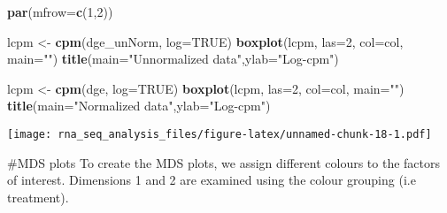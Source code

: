 \documentclass[
]{article}
\newenvironment{Shaded}{\begin{snugshade}}{\end{snugshade}}
\newcommand{\CommentTok}[1]{\textcolor[rgb]{0.56,0.35,0.01}{\textit{#1}}}
\newcommand{\DataTypeTok}[1]{\textcolor[rgb]{0.13,0.29,0.53}{#1}}
\newcommand{\DecValTok}[1]{\textcolor[rgb]{0.00,0.00,0.81}{#1}}
\newcommand{\KeywordTok}[1]{\textcolor[rgb]{0.13,0.29,0.53}{\textbf{#1}}}
\newcommand{\NormalTok}[1]{#1}
\newcommand{\OperatorTok}[1]{\textcolor[rgb]{0.81,0.36,0.00}{\textbf{#1}}}
\newcommand{\OtherTok}[1]{\textcolor[rgb]{0.56,0.35,0.01}{#1}}
\newcommand{\StringTok}[1]{\textcolor[rgb]{0.31,0.60,0.02}{#1}}
\begin{document}
\begin{Shaded}
\begin{Highlighting}[]
\KeywordTok{par}\NormalTok{(}\DataTypeTok{mfrow=}\KeywordTok{c}\NormalTok{(}\DecValTok{1}\NormalTok{,}\DecValTok{2}\NormalTok{))}

\NormalTok{lcpm <-}\StringTok{ }\KeywordTok{cpm}\NormalTok{(dge_unNorm, }\DataTypeTok{log=}\OtherTok{TRUE}\NormalTok{)}
\KeywordTok{boxplot}\NormalTok{(lcpm, }\DataTypeTok{las=}\DecValTok{2}\NormalTok{, }\DataTypeTok{col=}\NormalTok{col, }\DataTypeTok{main=}\StringTok{""}\NormalTok{)}
\KeywordTok{title}\NormalTok{(}\DataTypeTok{main=}\StringTok{"Unnormalized data"}\NormalTok{,}\DataTypeTok{ylab=}\StringTok{"Log-cpm"}\NormalTok{)}

\NormalTok{lcpm <-}\StringTok{ }\KeywordTok{cpm}\NormalTok{(dge, }\DataTypeTok{log=}\OtherTok{TRUE}\NormalTok{)}
\KeywordTok{boxplot}\NormalTok{(lcpm, }\DataTypeTok{las=}\DecValTok{2}\NormalTok{, }\DataTypeTok{col=}\NormalTok{col, }\DataTypeTok{main=}\StringTok{""}\NormalTok{)}
\KeywordTok{title}\NormalTok{(}\DataTypeTok{main=}\StringTok{"Normalized data"}\NormalTok{,}\DataTypeTok{ylab=}\StringTok{"Log-cpm"}\NormalTok{)}
\end{Highlighting}
\end{Shaded}

\texttt{[image: rna\_seq\_analysis\_files/figure-latex/unnamed-chunk-18-1.pdf]}

\#MDS plots To create the MDS plots, we assign different colours to the
factors of interest. Dimensions 1 and 2 are examined using the colour
grouping (i.e treatment).

\begin{Shaded}
\end{Shaded}
\end{document}
